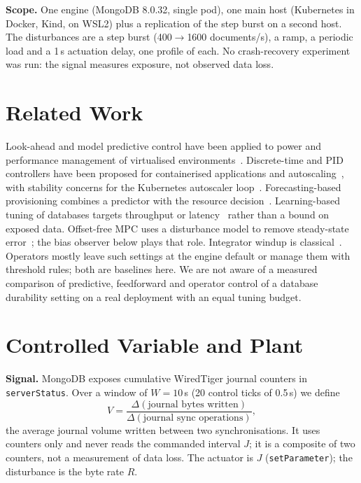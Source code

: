 \documentclass[journal]{IEEEtran}
\begin{document}
\textbf{Scope.} One engine (MongoDB 8.0.32, single pod), one main host (Kubernetes in Docker, Kind, on WSL2) plus a replication of the step burst on a second host. The disturbances are a step burst (400$\to$1600 documents/s), a ramp, a periodic load and a 1\,s actuation delay, one profile of each. No crash-recovery experiment was run: the signal measures exposure, not observed data loss.

\section{Related Work}\label{sec:related}
Look-ahead and model predictive control have been applied to power and performance management of virtualised environments~\cite{kusic2009lookahead,padala2009automated,fang2016qos}. Discrete-time and PID controllers have been proposed for containerised applications and autoscaling~\cite{baresi2016discrete,sabuhi2021adaptive,cai2022inverse,pozdniakova2024sla}, with stability concerns for the Kubernetes autoscaler loop~\cite{serracanta2025stability}. Forecasting-based provisioning combines a predictor with the resource decision~\cite{roy2011autoscaling,gong2010press,joshi2024arimapid}. Learning-based tuning of databases targets throughput or latency~\cite{vanaken2017ottertune,zhang2019cdbtune,ferreira2020selftunable} rather than a bound on exposed data. Offset-free MPC uses a disturbance model to remove steady-state error~\cite{muske2002disturbance,pannocchia2003disturbance}; the bias observer below plays that role. Integrator windup is classical~\cite{astrom1989windup,kothare1994antiwindup}. Operators mostly leave such settings at the engine default or manage them with threshold rules; both are baselines here. We are not aware of a measured comparison of predictive, feedforward and operator control of a database durability setting on a real deployment with an equal tuning budget.

\section{Controlled Variable and Plant}\label{sec:plant}
\textbf{Signal.} MongoDB exposes cumulative WiredTiger journal counters in \texttt{serverStatus}. Over a window of $W=10$\,s (20 control ticks of 0.5\,s) we define
\begin{equation}
V=\frac{\Delta(\text{journal bytes written})}{\Delta(\text{journal sync operations})},
\end{equation}
the average journal volume written between two synchronisations. It uses counters only and never reads the commanded interval $J$; it is a composite of two counters, not a measurement of data loss. The actuator is $J$ (\texttt{setParameter}); the disturbance is the byte rate $R$.
\end{document}
